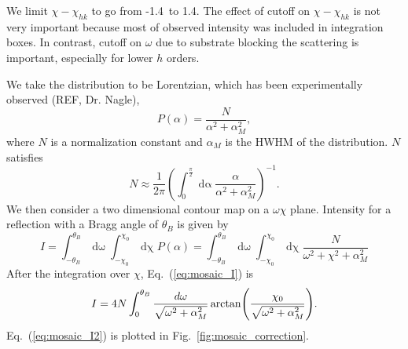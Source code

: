 We limit 
$\chi-\chi_{hk}$ to go from -1.4\textdegree\ to 1.4\textdegree. 
The effect of cutoff on $\chi-\chi_{hk}$ is not very important
because most of observed intensity was included in integration boxes.
In contrast, cutoff on $\omega$ due to substrate blocking the scattering
is important, especially for lower $h$ orders.
 
We take the distribution to be Lorentzian, which has been experimentally
observed (REF, Dr. Nagle),
\begin{equation}
  P(\alpha) = \frac{N}{\alpha^2+\alpha_M^2},
\end{equation}
where $N$ is a normalization constant and $\alpha_M$ is the HWHM of the 
distribution. $N$ satisfies
\begin{equation}
  N \approx \frac{1}{2\pi}\left(\int_0^{\frac{\pi}{2}}\mathop{d\alpha}
  \frac{\alpha}{\alpha^2+\alpha_M^2}\right)^{-1}.
  \label{eq:mosaic_N}
\end{equation}
We then consider a two dimensional contour map on a $\omega\chi$ plane.
Intensity for a reflection with a Bragg angle of $\theta_B$ is
given by
\begin{equation}
  I = \int_{-\theta_B}^{\theta_B}\mathop{d\omega} 
  \int_{-\chi_0}^{\chi_0}\mathop{d\chi} P(\alpha)
  = \int_{-\theta_B}^{\theta_B}\mathop{d\omega}
  \int_{-\chi_0}^{\chi_0}\mathop{d\chi}
  \frac{N}{\omega^2+\chi^2+\alpha_M^2}
  \label{eq:mosaic_I}
\end{equation}
After the integration over $\chi$, Eq.~(\ref{eq:mosaic_I}) is
\begin{equation}
  I = 4N\int_0^{\theta_B}\frac{d\omega}{\sqrt{\omega^2+\alpha_M^2}}
  \arctan\mathopen{}\left( \frac{\chi_0}{\sqrt{\omega^2+\alpha_M^2}} \right)\mathclose{}.
  \label{eq:mosaic_I2}
\end{equation}
Eq.~(\ref{eq:mosaic_I2}) is plotted in Fig.~\ref{fig:mosaic_correction}.

